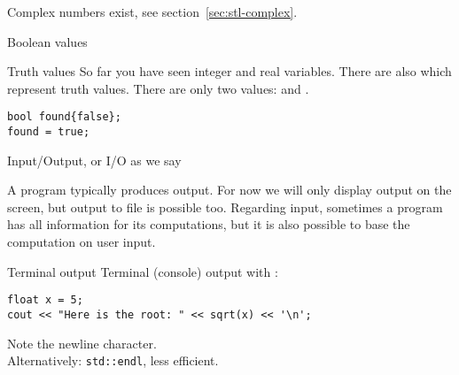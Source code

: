\begin{comment}
  The following exercise illustrates another point about computer numbers.

  \begin{exercise}
    \label{ex:macheps}
    Define 
    \begin{lstlisting}
      float one = 1.;
    \end{lstlisting}
    and
    \begin{enumerate}
    \item Read a \lstinline{float eps},
    \item Make a new variable that has the value \lstinline{one+eps}. Print
      this.
    \item Make another variable that is the previous one minus
      \lstinline{one}. Print the result again.
    \item Test your program with \lstinline{.001}, \lstinline{.0001}, \lstinline{.00001},
      \lstinline{000001}. Do you understand the result?
    \end{enumerate}
  \end{exercise}
\end{comment}

Complex numbers exist, see section~\ref{sec:stl-complex}.

 {Boolean values}

\begin{block}{Truth values}
  \label{sl:bool-var}
  So far you have seen integer and real variables. There are also
   which represent truth values. There are
  only two values:  and .
\begin{lstlisting}
bool found{false};
found = true;
\end{lstlisting}
\end{block}

 {Input/Output, or I/O as we say}
\label{sec:io}

A program typically produces output. For now we will only display
output on the screen, but output to file is possible too.  Regarding
input, sometimes a program has all information for its computations,
but it is also possible to base the computation on user input.

\begin{block}{Terminal output}
  \label{sl:cout}
Terminal (console) output with :
\begin{lstlisting}
float x = 5;
cout << "Here is the root: " << sqrt(x) << '\n';
\end{lstlisting}
Note the newline character.\\
Alternatively: \lstinline{std::endl}, less efficient.
\end{block}

